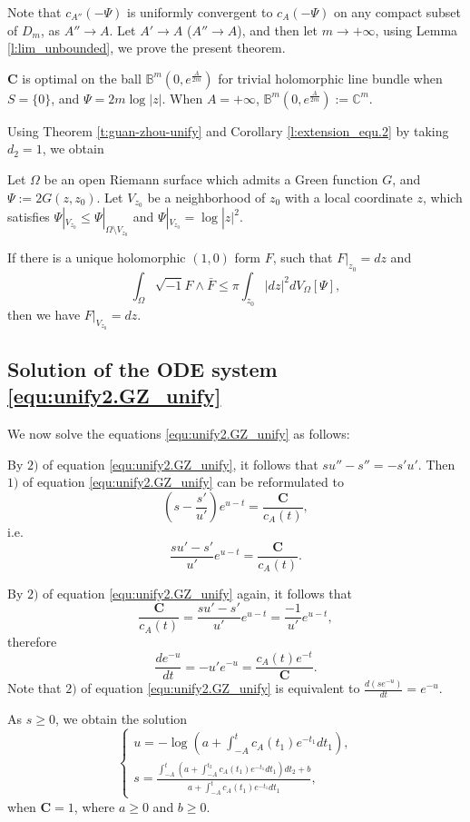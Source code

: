 Note that $c_{A''}(-\Psi)$ is uniformly convergent to $c_{A}(-\Psi)$
on any compact subset of $D_{m}$, as $A''\to A$. Let $A'\to A$
($A''\to A$), and then let $m\to+\infty$, using Lemma
\ref{l:lim_unbounded}, we prove the present theorem.

\begin{Remark}\label{r:guan-zhou-unify-exa1}
$\mathbf{C}$ is optimal on the ball $\mathbb{B}^{m}(0,e^{\frac{A}{2m}})$ for trivial
holomorphic line bundle when $S=\{0\}$, and $\Psi=2m\log|z|$.
When $A=+\infty$, $\mathbb{B}^{m}(0,e^{\frac{A}{2m}}):=\mathbb{C}^{m}$.
\end{Remark}

Using Theorem \ref{t:guan-zhou-unify} and Corollary
\ref{l:extension_equ.2} by taking $d_{2}=1$, we obtain

\begin{corollary}[][][c:unify.1]
  Let $\Omega$ be an open Riemann surface which
admits a Green function $G$, and $\Psi:=2G(z,z_{0})$. Let $V_{z_0}$
be a neighborhood of $z_0$ with a local coordinate $z$, which
satisfies $\Psi|_{V_{z_0}}\leq\Psi|_{\Omega\setminus V_{z_0}}$ and
$\Psi|_{V_{z_0}}=\log|z|^{2}$.

If there is a unique holomorphic $(1,0)$ form $F$, such that
$F|_{z_0}=dz$ and
$$\int_{\Omega}\sqrt{-1}F\wedge\bar{F}\leq\pi\int_{z_{0}}|dz|^{2}dV_{\Omega}[\Psi],$$
then we have
$F|_{V_{z_0}}=dz$.
\end{corollary}

\subsection{Solution of the ODE system \ref{equ:unify2.GZ_unify}}
\label{subsec:ODE}

We now solve the equations \ref{equ:unify2.GZ_unify} as follows:

By $2)$ of equation \ref{equ:unify2.GZ_unify}, it follows that
$su''-s''=-s'u'$. Then $1)$ of equation \ref{equ:unify2.GZ_unify}
can be reformulated to
$$(s-\frac{s'}{u'})e^{u-t}=\frac{\mathbf{C}}{c_{A}(t)},$$
i.e.
$$\frac{su'-s'}{u'}e^{u-t}=\frac{\mathbf{C}}{c_{A}(t)}.$$

By $2)$ of equation \ref{equ:unify2.GZ_unify} again, it follows that
$$\frac{\mathbf{C}}{c_{A}(t)}=\frac{su'-s'}{u'}e^{u-t}=\frac{-1}{u'}e^{u-t},$$
therefore
$$\frac{de^{-u}}{dt}=-u'e^{-u}=\frac{c_{A}(t)e^{-t}}{\mathbf{C}}.$$
Note that $2)$ of equation \ref{equ:unify2.GZ_unify} is equivalent to
$\frac{d(se^{-u})}{dt}=e^{-u}$.

As $s\geq 0$, we obtain the solution
\begin{displaymath}
     \begin{cases}
      u=-\log(a+\int_{-A}^{t}c_{A}(t_{1})e^{-t_{1}}dt_{1}), \\
      s=\frac{\int_{-A}^{t}(a+\int_{-A}^{t_{2}}c_{A}(t_{1})e^{-t_{1}}dt_{1})dt_{2}+b}
      {a+\int_{-A}^{t}c_{A}(t_{1})e^{-t_{1}}dt_{1}},
      \end{cases}
\end{displaymath}
when $\mathbf{C}=1$, where $a\geq 0$ and $b\geq0$.

